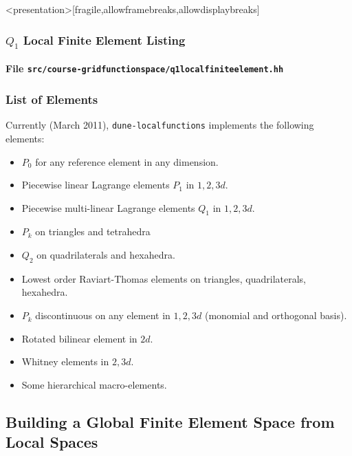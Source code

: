 \begin{frame}<presentation>[fragile,allowframebreaks,allowdisplaybreaks]
\frametitle<presentation>{$Q_1$ Local Finite Element Listing}
\framesubtitle<presentation>{File \texttt{src/course-gridfunctionspace/q1localfiniteelement.hh}}

\end{frame}

\begin{frame}
\frametitle{List of Elements}
Currently (March 2011), \lstinline{dune-localfunctions} implements the
following elements:
\begin{itemize}
\item $P_0$ for any reference element in any dimension. 
\item Piecewise linear Lagrange elements $P_1$ in $1, 2, 3d$.
\item Piecewise multi-linear Lagrange elements $Q_1$ in $1, 2, 3d$.
\item $P_k$ on triangles and tetrahedra
\item $Q_2$ on quadrilaterals and hexahedra.
\item Lowest order Raviart-Thomas elements on triangles, quadrilaterals, hexahedra.
\item $P_k$ discontinuous on any element in $1, 2, 3d$ (monomial and orthogonal basis).
\item Rotated bilinear element in $2d$.
\item Whitney elements in $2, 3d$.
\item Some hierarchical macro-elements.
\end{itemize}
\end{frame}

\subsection{Building a Global Finite Element Space from Local Spaces}

